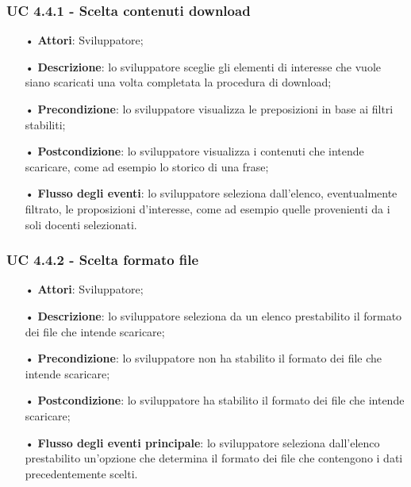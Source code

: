 \subsubsection{UC 4.4.1 - Scelta contenuti download}
\begin{itemize}
\item[•]\textbf{Attori}: Sviluppatore;
\item[•]\textbf{Descrizione}: lo sviluppatore sceglie gli elementi di interesse che vuole siano scaricati una volta completata la procedura di download;
\item[•]\textbf{Precondizione}: lo sviluppatore visualizza le preposizioni in base ai filtri stabiliti;
\item[•]\textbf{Postcondizione}: lo sviluppatore visualizza i contenuti che intende scaricare, come ad esempio lo storico di una frase;
\item[•]\textbf{Flusso degli eventi}: lo sviluppatore seleziona dall'elenco, eventualmente filtrato, le proposizioni d'interesse, come ad esempio quelle provenienti da i soli docenti selezionati.
\end{itemize}

\subsubsection{UC 4.4.2 - Scelta formato file}
\begin{itemize}
\item[•]\textbf{Attori}: Sviluppatore;
\item[•]\textbf{Descrizione}:  lo sviluppatore seleziona da un elenco prestabilito il formato dei file che intende scaricare;
\item[•]\textbf{Precondizione}: lo sviluppatore non ha stabilito il formato dei file che intende scaricare;
\item[•]\textbf{Postcondizione}: lo sviluppatore ha stabilito il formato dei file che intende scaricare;
\item[•]\textbf{Flusso degli eventi principale}:  lo sviluppatore seleziona dall'elenco prestabilito un'opzione che determina il formato dei file che contengono i dati precedentemente scelti.
\end{itemize}

